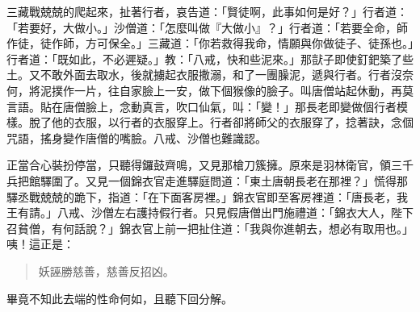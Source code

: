 三藏戰兢兢的爬起來，扯著行者，哀告道：「賢徒啊，此事如何是好？」行者道：「若要好，大做小。」沙僧道：「怎麼叫做『大做小』？」行者道：「若要全命，師作徒，徒作師，方可保全。」三藏道：「你若救得我命，情願與你做徒子、徒孫也。」行者道：「既如此，不必遲疑。」教：「八戒，快和些泥來。」那獃子即使釘鈀築了些土。又不敢外面去取水，後就擄起衣服撒溺，和了一團臊泥，遞與行者。行者沒奈何，將泥撲作一片，往自家臉上一安，做下個猴像的臉子。叫唐僧站起休動，再莫言語。貼在唐僧臉上，念動真言，吹口仙氣，叫：「變！」那長老即變做個行者模樣。脫了他的衣服，以行者的衣服穿上。行者卻將師父的衣服穿了，捻著訣，念個咒語，搖身變作唐僧的嘴臉。八戒、沙僧也難識認。

正當合心裝扮停當，只聽得鑼鼓齊鳴，又見那槍刀簇擁。原來是羽林衛官，領三千兵把館驛圍了。又見一個錦衣官走進驛庭問道：「東土唐朝長老在那裡？」慌得那驛丞戰兢兢的跪下，指道：「在下面客房裡。」錦衣官即至客房裡道：「唐長老，我王有請。」八戒、沙僧左右護持假行者。只見假唐僧出門施禮道：「錦衣大人，陛下召貧僧，有何話說？」錦衣官上前一把扯住道：「我與你進朝去，想必有取用也。」咦！這正是：
\begin{quote}
妖誣勝慈善，慈善反招凶。
\end{quote}

畢竟不知此去端的性命何如，且聽下回分解。
